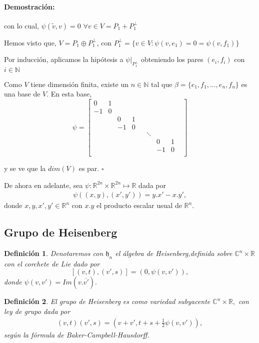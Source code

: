 \documentclass[12pt]{article}
\newtheorem{definition}{Definición}
\newenvironment{proof}{\paragraph{Demostración:}}{\hfill$\square$}
\begin{document}
\begin{proof}
 con lo cual, $\psi(\tilde{v},v)=0$ $\forall v \in V=P_1 + P_1^{\bot}$
 
 
Hemos visto que, $V=P_1 \oplus P_1^{\bot}$, con $P_1^{\bot}=\{v \in V : \psi(v,e_1)=0=\psi(v,f_1)\}$

Por inducción, aplicamos la hipótesis a $\psi|_{P_1^{\bot}}$ obteniendo los pares $(e_i,f_i)$ con $i \in \mathbb{N}$

Como $V$ tiene dimensión finita, existe un $n \in \mathbb{N}$ tal que  $\beta=\{e_1,f_1,...,e_n,f_n\}$ es una base de $V$.
En esta base, 
$$\psi = 
\begin{bmatrix}
 0 & 1 & & & & & & &\\ 
 -1& 0 & & & & & & &\\
 & & 0 & 1 & & & & &\\
 & & -1 & 0 & & & & &\\
 & &  &  & & \ddots & & &\\
 & &  &  & & & 0 & 1 &\\
 & &  &  & & & -1 & 0 &\\ 
\end{bmatrix}
$$

y se ve que la $dim(V)$ es par. 
\end{proof}
\newline


De ahora en adelante, sea $\psi :\mathbb{R}^{2n} \times \mathbb{R}^{2n}\mapsto \mathbb{R}$ dada por 
$$ \begin{aligned}
\psi((x,y),(x',y'))=y.x'-x.y' ,
\end{aligned}$$
donde $x,y,x',y' \in \mathbb{R}^n$ con  $x.y$ el producto escalar usual de $\mathbb{R}^n$.

\subsection{Grupo de Heisenberg}
\begin{definition}
Denotaremos con $\mathfrak{h}_n$ el álgebra de Heisenberg,definida sobre
$\mathbb{C}^n \times \mathbb{R}$  con el corchete de Lie dado por 
$$
[(v,t),(v',s)]=(0,\psi(v,v')),
$$
donde  $\psi (v,v')=Im(v.\overline{v'}).$
\end{definition}

\begin{definition}
El grupo de Heisenberg es como variedad subyacente $\mathbb{C}^{n}\times \mathbb{R},$ con
ley de grupo dada por 
$$\begin{aligned}
(v,t)(v',s)=(v+v',t+s+ \frac{1}{2} \psi(v,v')),
\end{aligned}$$
según la fórmula de Baker-Campbell-Hausdorff.
\end{definition}
\end{document}
